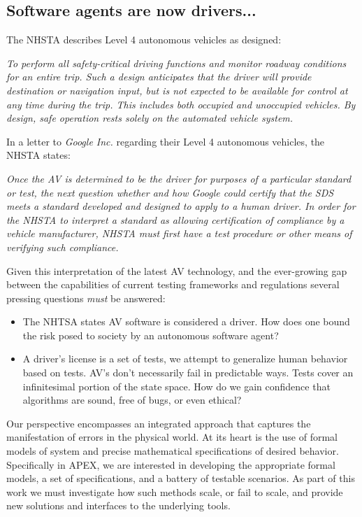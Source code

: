  \subsection{Software agents are now drivers...}
The NHSTA describes Level 4 autonomous vehicles as designed:
\begin{displayquote}
	\emph{To perform all safety-critical driving functions and monitor roadway conditions for an entire trip. Such a design anticipates that the driver will provide destination or navigation input, but is not expected to be available for control at any time during the trip. This includes both occupied and unoccupied vehicles. By design, safe operation rests solely on the automated vehicle system.} 
\end{displayquote}

In a letter to \emph{Google Inc.} regarding their Level 4 autonomous vehicles, the NHSTA states:
\begin{displayquote}
	\emph{Once the AV is determined to be the driver for purposes of a particular standard or test, the next question whether and how Google could certify that the SDS meets a standard developed and designed to apply to a human driver. In order for the NHSTA to interpret a standard as allowing certification of compliance by a vehicle manufacturer, NHSTA must first have a test procedure or other means of verifying such compliance.}
\end{displayquote}

Given this interpretation of the latest AV technology, and the ever-growing gap between the capabilities of current testing frameworks and regulations several pressing questions \emph{must} be answered:
\begin{itemize}
	\item The NHTSA states AV software is considered a driver. How does one bound the risk posed to society by an autonomous software agent?
	\item A driver's license is a set of tests, we attempt to generalize human behavior based on tests. AV's don't necessarily fail in predictable ways. Tests cover an infinitesimal portion of the state space. How do we gain confidence that algorithms are sound, free of bugs, or even ethical?
\end{itemize}

Our perspective encompasses an integrated approach that captures the manifestation of errors in the physical world. At its heart is the use of formal models of system and precise mathematical specifications of desired behavior. Specifically in APEX, we are interested in developing the appropriate formal models, a set of specifications, and a battery of testable scenarios. As part of this work we must investigate how such methods scale, or fail to scale, and provide new solutions and interfaces to the underlying tools. 
 
